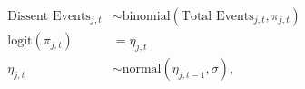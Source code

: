\documentclass[12pt]{article}
\begin{document}
\begin{align*}
\text{Dissent Events}_{j,t} &\sim \text{binomial}(\text{Total Events}_{j,t}, \pi_{j,t})\\
\text{logit}(\pi_{j,t}) &= \eta_{j, t}\\
\eta_{j,t} &\sim \text{normal}(\eta_{j, t-1}, \sigma),
\end{align*}
\end{document}
